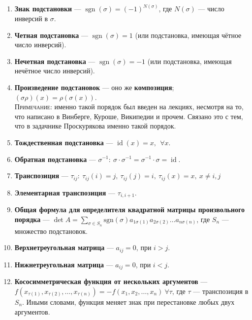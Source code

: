 \documentclass[a4paper, 12pt]{article}
\DeclareMathOperator{\sgn}{sgn}
\DeclareMathOperator{\id}{id}
\begin{document}
\begin{enumerate}
\item \textbf{Знак подстановки} — $\sgn(\sigma) = (-1)^{N(\sigma)}$, где $N(\sigma)$ --- число инверсий в $\sigma$.

\item \textbf{Четная подстановка} — $\sgn (\sigma) = 1$ (или подстановка, имеющая чётное число инверсий).

\item \textbf{Нечетная подстановка} — $\sgn(\sigma) = -1$ (или подстановка, имеющая нечётное число инверсий).

\item \textbf{Произведение подстановок} — оно же \textbf{композиция}; $(\sigma\rho)(x) = \rho(\sigma(x))$. \\
\textsc{Примечание:} именно такой порядок был введен на лекциях, несмотря на то, что написано в Винберге, Куроше, Википедии и прочем. Связано это с тем, что в задачнике Проскурякова именно такой порядок.

\item \textbf{Тождественная подстановка} — $\id(x) = x,\ \  \forall x$.

\item \textbf{Обратная подстановка} — $\sigma^{-1}:\  \sigma \cdot \sigma^{-1} = \sigma^{-1} \cdot \sigma = \id$.

\item \textbf{Транспозиция} — $\tau_{ij}:\ \tau_{ij}(i) = j,\ \tau_{ij}(j) = i,\ \tau_{ij}(x) = x, \ x \not= i, j$

\item \textbf{Элементарная транспозиция} — $\tau_{i, i+1}$.

\item \textbf{Общая формула для определителя квадратной матрицы произвольного порядка} — $\det{A} = \sum\limits_{\sigma \in S_n} \text{sgn}(\sigma)a_{1\sigma(1)}a_{2\sigma(2)}\ldots a_{n\sigma(n)}$, где $S_n$ --- множество подстановок.

\item \textbf{Верхнетреугольная матрица} — $a_{ij} = 0$, при $i > j$.


\item \textbf{Нижнетреугольная матрица} — $a_{ij} = 0$, при $i < j$.

\item \textbf{Кососимметрическая функция от нескольких аргументов} ---\\ $f(x_{\tau(1)}, x_{\tau(2)}, \dots, x_{\tau(n)}) = -f(x_1, x_2, \dots, x_n)\ \forall \tau$, где $\tau$ — транспозиция в $S_n$. Иными словами, функция меняет знак при перестановке любых двух аргументов.


\end{enumerate}
\end{document}
